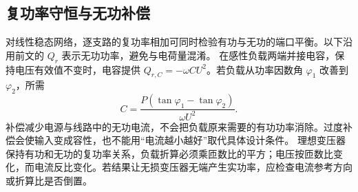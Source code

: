 \subsection{复功率守恒与无功补偿}
对线性稳态网络，逐支路的复功率相加可同时检验有功与无功的端口平衡。以下沿用前文的 $Q_r$ 表示无功功率，避免与电荷量混淆。
在感性负载两端并接电容，保持电压有效值不变时，电容提供 $Q_{r,C}=-\omega CU^2$。若负载从功率因数角 $\varphi_1$ 改善到 $\varphi_2$，所需
\[
 C=\frac{P(\tan\varphi_1-\tan\varphi_2)}{\omega U^2}.
\]
补偿减少电源与线路中的无功电流，不会把负载原来需要的有功功率消除。过度补偿会使输入变成容性，也不能用“电流越小越好”取代具体设计条件。
理想变压器保持有功和无功的复功率关系，负载折算必须乘匝数比的平方；电压按匝数比变化，而电流反比变化。若结果让无损变压器无端产生实功率，应检查电流参考方向或折算比是否倒置。




\begingroup{}

\endgroup


\endgroup
